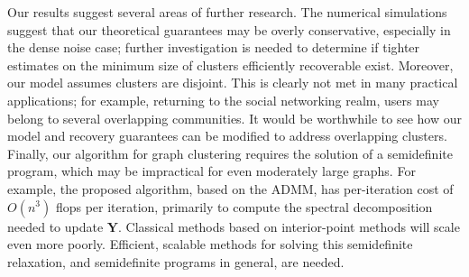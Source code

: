 \documentclass[twoside,11pt]{article}
\newcommand{\bs}{\boldsymbol}
\newcommand{\Y}{\bs {Y}}
\newcommand{\0}{\bs{0}}
\begin{document}
Our results suggest several areas of further research.
The numerical simulations suggest that our theoretical guarantees may be overly conservative, especially in the dense noise case;
further investigation is needed to determine if tighter estimates on the minimum size of clusters efficiently recoverable
exist.
Moreover, our model assumes clusters are disjoint. This is clearly not met in many practical applications; for example,
returning to the social networking realm,
users may belong to several overlapping communities.
It would be worthwhile to see how our model and recovery guarantees can be modified to address overlapping clusters.
Finally, our algorithm for graph clustering requires the solution of a semidefinite program, which may be impractical for
even moderately large graphs.
For example, the proposed algorithm, based on the ADMM, has per-iteration cost of $O(n^3)$ flops per iteration, primarily to compute the spectral decomposition needed to update $\Y$. Classical methods based on interior-point methods will scale even more poorly. Efficient, scalable methods for solving this semidefinite relaxation, and semidefinite programs in general, are needed.

%
\appendix
\end{document}
